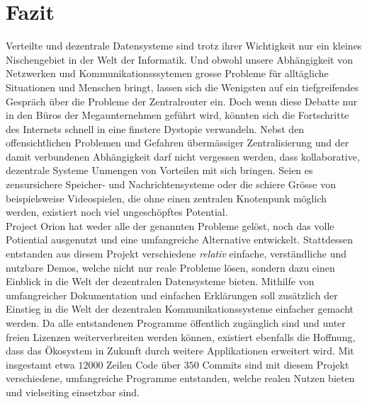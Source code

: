 \documentclass[a4paper,11pt,titlepage,twoside]{memoir}
\begin{document}
\chapter{Fazit}
\label{sec:org07afa3f}
Verteilte und dezentrale Datensysteme sind trotz ihrer Wichtigkeit nur
ein kleines Nischengebiet in der Welt der Informatik. Und obwohl
unsere Abhängigkeit von Netzwerken und Kommunikationsssytemen grosse
Probleme für alltägliche Situationen und Menschen bringt, lassen sich
die Wenigsten auf ein tiefgreifendes Gespräch über die Probleme der
Zentralrouter ein. Doch wenn diese Debatte nur in den Büros der
Megaunternehmen geführt wird, könnten sich die Fortschritte des
Internets schnell in eine finstere Dystopie verwandeln. Nebst den
offensichtlichen Problemen und Gefahren übermässiger Zentralisierung
und der damit verbundenen Abhängigkeit darf nicht vergessen werden,
dass kollaborative, dezentrale Systeme Unmengen von Vorteilen mit sich
bringen. Seien es zensursichere Speicher- und Nachrichtensysteme oder
die schiere Grösse von beispielsweise Videospielen, die ohne einen
zentralen Knotenpunk möglich werden, existiert noch viel ungeschöpftes
Potential.\\

\noindent Project Orion hat weder alle der genannten Probleme gelöst,
noch das volle Potiential ausgenutzt und eine umfangreiche Alternative
entwickelt. Stattdessen entstanden aus diesem Projekt verschiedene
\emph{relativ} einfache, verständliche und nutzbare Demos, welche nicht nur
reale Probleme lösen, sondern dazu einen Einblick in die Welt der
dezentralen Datensysteme bieten. Mithilfe von umfangreicher
Dokumentation und einfachen Erklärungen soll zusätzlich der Einstieg
in die Welt der dezentralen Kommunikationssysteme einfacher gemacht
werden. Da alle entstandenen Programme öffentlich zugänglich sind und
unter freien Lizenzen weiterverbreiten werden können, existiert
ebenfalls die Hoffnung, dass das Ökosystem in Zukunft durch weitere
Applikationen erweitert wird. Mit insgestamt etwa \(12000\) Zeilen
Code über \(350\) Commits sind mit diesem Projekt verschiedene,
umfangreiche Programme entstanden, welche realen Nutzen bieten und
vielseiting einsetzbar sind.


\end{document}
